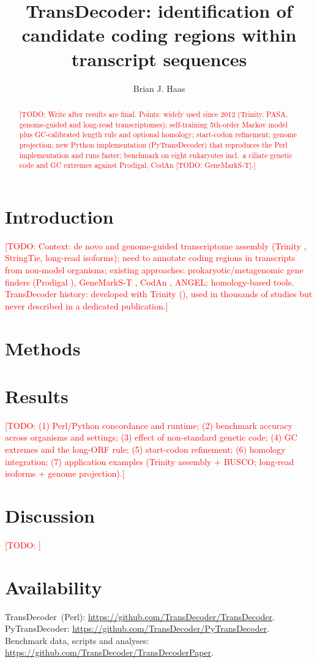\documentclass[11pt]{article}
\title{TransDecoder: identification of candidate coding regions within transcript sequences}
\author{Brian J. Haas \and \todo{co-authors}}
\date{}
\newcommand{\todo}[1]{\textcolor{red}{[TODO: #1]}}
\newcommand{\TD}{TransDecoder}
\newcommand{\PyTD}{PyTransDecoder}
\begin{document}
\maketitle

\begin{abstract}
\todo{Write after results are final. Points: widely used since 2012 (Trinity, PASA, genome-guided
and long-read transcriptomes); self-training 5th-order Markov model plus GC-calibrated length rule
and optional homology; start-codon refinement; genome projection; new Python implementation
(\PyTD) that reproduces the Perl implementation and runs faster; benchmark on eight eukaryotes
incl.\ a ciliate genetic code and GC extremes against Prodigal, CodAn
\todo{GeneMarkS-T}.}
\end{abstract}

\section{Introduction}
\todo{Context: de novo and genome-guided transcriptome assembly (Trinity \citep{Grabherr2011},
StringTie, long-read isoforms); need to annotate coding regions in transcripts from non-model
organisms; existing approaches: prokaryotic/metagenomic gene finders (Prodigal \citep{Hyatt2010}),
GeneMarkS-T \citep{Tang2015}, CodAn \citep{Nachtigall2021}, ANGEL; homology-based tools.
TransDecoder history: developed with Trinity (\citealp{Haas2013}), used in thousands of studies but
never described in a dedicated publication.}

\section{Methods}




\section{Results}
\todo{(1) Perl/Python concordance and runtime; (2) benchmark accuracy across organisms and settings;
(3) effect of non-standard genetic code; (4) GC extremes and the long-ORF rule; (5) start-codon
refinement; (6) homology integration; (7) application examples (Trinity assembly + BUSCO;
long-read isoforms + genome projection).}


\section{Discussion}
\todo{}

\section*{Availability}
\TD\ (Perl): \url{https://github.com/TransDecoder/TransDecoder}.
\PyTD: \url{https://github.com/TransDecoder/PyTransDecoder}.
Benchmark data, scripts and analyses: \url{https://github.com/TransDecoder/TransDecoderPaper}.



\end{document}
